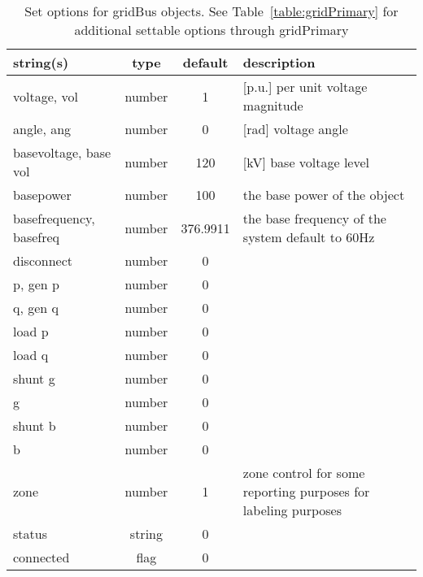 \begin{table}[ht]
\centering
\begin{tabular}{p{5cm} c c p{7cm}}
\hline
string(s) & type & default & description \\
\hline
voltage, vol & number & 1 & [p.u.]    per unit voltage magnitude\\
angle, ang & number & 0 & [rad]     voltage angle\\
basevoltage, base vol & number & 120 & [kV]    base voltage level\\
basepower & number & 100 & the base power of the object\\
basefrequency, basefreq & number & 376.9911 & the base frequency of the system default to 60Hz\\
disconnect & number & 0 & \\
p, gen p & number & 0 & \\
q, gen q & number & 0 & \\
load p & number & 0 & \\
load q & number & 0 & \\
shunt g & number & 0 & \\
g & number & 0 & \\
shunt b & number & 0 & \\
b & number & 0 & \\
zone & number & 1 & zone control for some reporting purposes for labeling purposes\\
status & string & 0 & \\
connected & flag & 0 & \\
\hline
\end{tabular}
\caption{Set options for gridBus objects. See Table~\ref{table:gridPrimary} for additional settable options through gridPrimary}
\label{table:gridBus}
\end{table}
